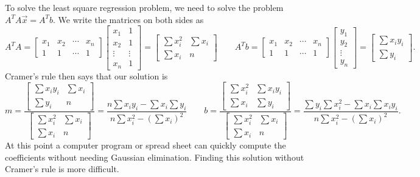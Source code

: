 \documentclass[10pt]{article}
\begin{document}
To solve the least square regression problem, we need to solve the problem $A^T A \vec x = A^T b$.  We write the matrices on both sides as 
$$A^T A 
=\begin{bmatrix}x_1&x_2&\cdots &x_n\\ 1&1&\cdots&1 \end{bmatrix} \begin{bmatrix}x_1&1\\x_2&1\\\vdots&\vdots \\x_n&1 \end{bmatrix} = \begin{bmatrix}\sum x_i^2 & \sum x_i \\ \sum x_i & n\end{bmatrix} 
\quad\quad
A^T b = \begin{bmatrix}x_1&x_2&\cdots &x_n\\ 1&1&\cdots&1 \end{bmatrix} \begin{bmatrix}y_1\\y_2\\\vdots \\y_n \end{bmatrix}=\begin{bmatrix}\sum x_iy_i\\\sum y_i\end{bmatrix}.
$$
Cramer's rule then says that our solution is 
$$m=\frac{\begin{bmatrix}\sum x_iy_i & \sum x_i \\ \sum y_i & n\end{bmatrix} }{\begin{bmatrix}\sum x_i^2 & \sum x_i \\ \sum x_i & n\end{bmatrix} } = \frac{n\sum x_iy_i -\sum x_i\sum y_i}{ n\sum x_i^2 -\left(\sum x_i\right)^2} \quad\quad
b=\frac{\begin{bmatrix}\sum x_i^2 & \sum x_iy_i \\ \sum x_i & \sum y_i\end{bmatrix} }{\begin{bmatrix}\sum x_i^2 & \sum x_i \\ \sum x_i & n\end{bmatrix} } = \frac{\sum y_i\sum x_i^2 -\sum x_i\sum x_iy_i}{ n\sum x_i^2 -\left(\sum x_i\right)^2}.
$$
At this point a computer program or spread sheet can quickly compute the coefficients without needing Gaussian elimination. Finding this solution without Cramer's rule is more difficult.
\end{document}
